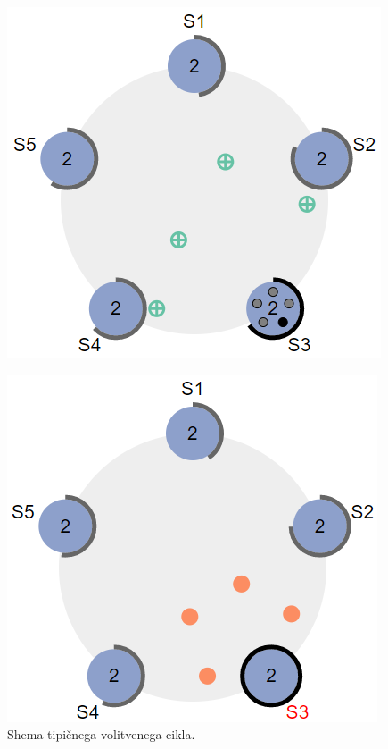 \documentclass[runningheads]{llncs}
\begin{document}
\begin{figure}
\includegraphics[scale=0.30]{raft_pics/raft4.png}
\end{figure}
\begin{figure}
\includegraphics[scale=0.30]{raft_pics/raft5.png}
\caption{Shema tipičnega volitvenega cikla.}
\end{figure}
\end{document}
